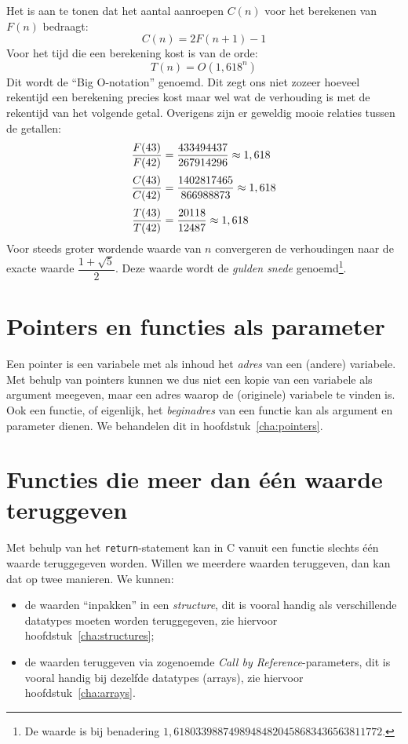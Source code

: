 Het is aan te tonen dat het aantal aanroepen $C(n)$ voor het berekenen van $F(n)$ bedraagt:
%
\begin{equation}
C(n) = 2F(n+1)-1
\end{equation}
%
Voor het tijd die een berekening kost is van de orde:
%
\begin{equation}
T(n) = O(1,618^n)
\end{equation}
%
Dit wordt de ``Big O-notation'' genoemd. Dit zegt ons niet zozeer hoeveel rekentijd een berekening precies kost maar wel wat de verhouding is met de rekentijd van het volgende getal. Overigens zijn er geweldig mooie relaties tussen de getallen:
%
\begin{equation}
\jot=5pt
\begin{split}
\dfrac{F(43)}{F(42)} &= \dfrac{433494437}{267914296}\approx 1,618\\
\dfrac{C(43)}{C(42)} &= \dfrac{1402817465}{866988873}\approx 1,618\\
\dfrac{T(43)}{T(42)} &= \dfrac{20118}{12487}\approx 1,618
\end{split}\end{equation}
%
Voor steeds groter wordende waarde van $n$ convergeren de verhoudingen naar de exacte waarde $\dfrac{1+\sqrt{5}}{2}$. Deze waarde wordt de \textsl{gulden snede} genoemd\footnote{De waarde is bij benadering $1,61803398874989484820458683436563811772$.}.
\basic


\section{Pointers en functies als parameter}
Een pointer is een variabele met als inhoud het \textsl{adres} van een (andere) variabele. Met behulp van pointers kunnen we dus niet een kopie van een variabele als argument meegeven, maar een adres waarop de (originele) variabele te vinden is. Ook een functie, of eigenlijk, het \textsl{beginadres} van een functie kan als argument en parameter dienen. We behandelen dit in hoofdstuk~\ref{cha:pointers}.


\section{Functies die meer dan één waarde teruggeven}
Met behulp van het \texttt{return}-statement kan in C vanuit een functie slechts één waarde teruggegeven worden.
Willen we meerdere waarden teruggeven, dan kan dat op twee manieren. 
We kunnen:
\begin{itemize}
	\item
	de waarden ``inpakken'' in een \textsl{structure}, dit is vooral handig als verschillende datatypes moeten worden teruggegeven, zie hiervoor hoofdstuk~\ref{cha:structures};
	\item
	de waarden teruggeven via zogenoemde \emph{Call by Reference}-parameters, dit is vooral handig bij dezelfde datatypes (arrays), zie hiervoor hoofdstuk~\ref{cha:arrays}.
\end{itemize}


